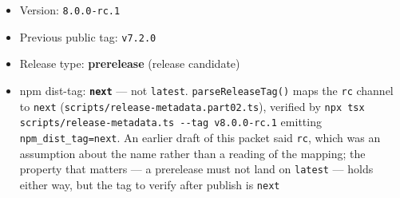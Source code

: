\begin{itemize}
\tightlist
\item
  Version: \texttt{8\allowbreak{}.\allowbreak{}0\allowbreak{}.\allowbreak{}0\allowbreak{}-\allowbreak{}r\allowbreak{}c\allowbreak{}.\allowbreak{}1}
\item
  Previous public tag: \texttt{v\allowbreak{}7\allowbreak{}.\allowbreak{}2\allowbreak{}.\allowbreak{}0}
\item
  Release type: \textbf{prerelease} (release candidate)
\item
  npm dist-tag: \textbf{\texttt{n\allowbreak{}e\allowbreak{}x\allowbreak{}t}} --- not \texttt{l\allowbreak{}a\allowbreak{}t\allowbreak{}e\allowbreak{}s\allowbreak{}t}. \texttt{p\allowbreak{}a\allowbreak{}r\allowbreak{}s\allowbreak{}e\allowbreak{}R\allowbreak{}e\allowbreak{}l\allowbreak{}e\allowbreak{}a\allowbreak{}s\allowbreak{}e\allowbreak{}T\allowbreak{}a\allowbreak{}g\allowbreak{}(\allowbreak{})} maps the \texttt{r\allowbreak{}c} channel to \texttt{n\allowbreak{}e\allowbreak{}x\allowbreak{}t} (\texttt{s\allowbreak{}c\allowbreak{}r\allowbreak{}i\allowbreak{}p\allowbreak{}t\allowbreak{}s\allowbreak{}/\allowbreak{}r\allowbreak{}e\allowbreak{}l\allowbreak{}e\allowbreak{}a\allowbreak{}s\allowbreak{}e\allowbreak{}-\allowbreak{}m\allowbreak{}e\allowbreak{}t\allowbreak{}a\allowbreak{}d\allowbreak{}a\allowbreak{}t\allowbreak{}a\allowbreak{}.\allowbreak{}p\allowbreak{}a\allowbreak{}r\allowbreak{}t\allowbreak{}0\allowbreak{}2\allowbreak{}.\allowbreak{}t\allowbreak{}s}), verified by \texttt{n\allowbreak{}p\allowbreak{}x\allowbreak{} \allowbreak{}t\allowbreak{}s\allowbreak{}x\allowbreak{} \allowbreak{}s\allowbreak{}c\allowbreak{}r\allowbreak{}i\allowbreak{}p\allowbreak{}t\allowbreak{}s\allowbreak{}/\allowbreak{}r\allowbreak{}e\allowbreak{}l\allowbreak{}e\allowbreak{}a\allowbreak{}s\allowbreak{}e\allowbreak{}-\allowbreak{}m\allowbreak{}e\allowbreak{}t\allowbreak{}a\allowbreak{}d\allowbreak{}a\allowbreak{}t\allowbreak{}a\allowbreak{}.\allowbreak{}t\allowbreak{}s\allowbreak{} \allowbreak{}-\allowbreak{}-\allowbreak{}t\allowbreak{}a\allowbreak{}g\allowbreak{} \allowbreak{}v\allowbreak{}8\allowbreak{}.\allowbreak{}0\allowbreak{}.\allowbreak{}0\allowbreak{}-\allowbreak{}r\allowbreak{}c\allowbreak{}.\allowbreak{}1} emitting \texttt{n\allowbreak{}p\allowbreak{}m\allowbreak{}\_\allowbreak{}d\allowbreak{}i\allowbreak{}s\allowbreak{}t\allowbreak{}\_\allowbreak{}t\allowbreak{}a\allowbreak{}g\allowbreak{}=\allowbreak{}n\allowbreak{}e\allowbreak{}x\allowbreak{}t}. An earlier draft of this packet said \texttt{r\allowbreak{}c}, which was an assumption about the name rather than a reading of the mapping; the property that matters --- a prerelease must not land on \texttt{l\allowbreak{}a\allowbreak{}t\allowbreak{}e\allowbreak{}s\allowbreak{}t} --- holds either way, but the tag to verify after publish is \texttt{n\allowbreak{}e\allowbreak{}x\allowbreak{}t}

\end{itemize}

